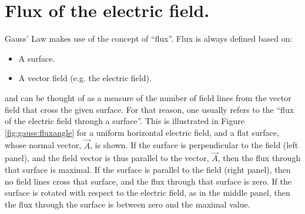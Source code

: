 \section{Flux of the electric field.}
\label{sec:gauss:flux}
Gauss' Law makes use of the concept of ``flux''. Flux is always defined based on:
\begin{itemize}
\item A surface.
\item A vector field (e.g. the electric field). 
\end{itemize}
and can be thought of as a measure of the number of field lines from the vector field that cross the given surface. For that reason, one usually refers to the ``flux of the electric field through a surface''. This is illustrated in Figure \ref{fig:gauss:fluxangle} for a uniform horizontal electric field, and a flat surface, whose normal vector, $\vec A$, is shown. If the surface is perpendicular to the field (left panel), and the field vector is thus parallel to the vector, $\vec A$, then the flux through that surface is maximal. If the surface is parallel to the field (right panel), then no field lines cross that surface, and the flux through that surface is zero. If the surface is rotated with respect to the electric field, as in the middle panel, then the flux through the surface is between zero and the maximal value.



